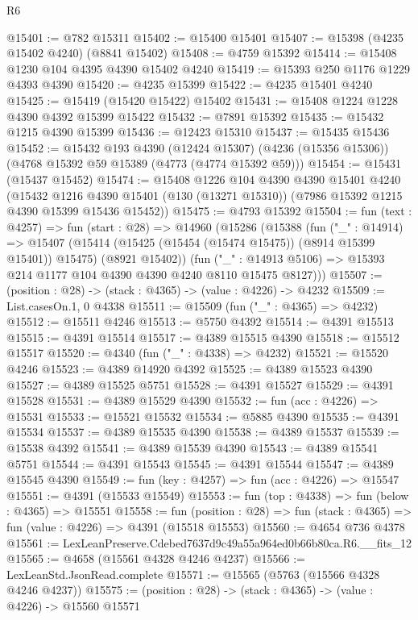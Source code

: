 \begin{lexlean}{R6}
\begin{coremodule}
@15401 := @782 @15311
@15402 := @15400 @15401
@15407 := @15398 (@4235 @15402 @4240) (@8841 @15402)
@15408 := @4759 @15392
@15414 := @15408 @1230 @104 @4395 @4390 @15402 @4240
@15419 := @15393 @250 @1176 @1229 @4393 @4390
@15420 := @4235 @15399
@15422 := @4235 @15401 @4240
@15425 := @15419 (@15420 @15422) @15402
@15431 := @15408 @1224 @1228 @4390 @4392 @15399 @15422
@15432 := @7891 @15392
@15435 := @15432 @1215 @4390 @15399
@15436 := @12423 @15310
@15437 := @15435 @15436
@15452 := @15432
    @193
    @4390
    (@12424 @15307)
    (@4236 (@15356 @15306))
    (@4768 @15392 @59 @15389 (@4773 (@4774 @15392 @59)))
@15454 := @15431 (@15437 @15452)
@15474 := @15408
    @1226
    @104
    @4390
    @4390
    @15401
    @4240
    (@15432
      @1216
      @4390
      @15401
      (@130 (@13271 @15310))
      (@7986 @15392 @1215 @4390 @15399 @15436 @15452))
@15475 := @4793 @15392
@15504 := fun (text : @4257) =>
  fun (start : @28) =>
  @14960
    (@15286
      (@15388
        (fun ("_" : @14914) =>
        @15407
          (@15414 (@15425 (@15454 (@15474 @15475)) (@8914 @15399 @15401)) @15475)
          (@8921 @15402))
        (fun ("_" : @14913 @5106) => @15393 @214 @1177 @104 @4390 @4390 @4240 @8110 @15475 @8127)))
@15507 := (position : @28) -> (stack : @4365) -> (value : @4226) -> @4232
@15509 := List.casesOn.{1, 0} @4338
@15511 := @15509 (fun ("_" : @4365) => @4232)
@15512 := @15511 @4246
@15513 := @5750 @4392
@15514 := @4391 @15513
@15515 := @4391 @15514
@15517 := @4389 @15515 @4390
@15518 := @15512 @15517
@15520 := @4340 (fun ("_" : @4338) => @4232)
@15521 := @15520 @4246
@15523 := @4389 @14920 @4392
@15525 := @4389 @15523 @4390
@15527 := @4389 @15525 @5751
@15528 := @4391 @15527
@15529 := @4391 @15528
@15531 := @4389 @15529 @4390
@15532 := fun (acc : @4226) => @15531
@15533 := @15521 @15532
@15534 := @5885 @4390
@15535 := @4391 @15534
@15537 := @4389 @15535 @4390
@15538 := @4389 @15537
@15539 := @15538 @4392
@15541 := @4389 @15539 @4390
@15543 := @4389 @15541 @5751
@15544 := @4391 @15543
@15545 := @4391 @15544
@15547 := @4389 @15545 @4390
@15549 := fun (key : @4257) => fun (acc : @4226) => @15547
@15551 := @4391 (@15533 @15549)
@15553 := fun (top : @4338) => fun (below : @4365) => @15551
@15558 := fun (position : @28) =>
  fun (stack : @4365) => fun (value : @4226) => @4391 (@15518 @15553)
@15560 := @4654 @736 @4378
@15561 := LexLeanPreserve.Cdebed7637d9c49a55a964ed0b66b80ca.R6.__fits_12
@15565 := @4658 (@15561 @4328 @4246 @4237)
@15566 := LexLeanStd.JsonRead.complete
@15571 := @15565 (@5763 (@15566 @4328 @4246 @4237))
@15575 := (position : @28) -> (stack : @4365) -> (value : @4226) -> @15560 @15571

\end{coremodule}
\end{lexlean}
